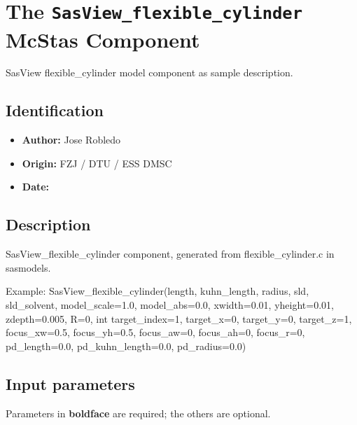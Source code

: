 \section{The \texttt{SasView\_flexible\_cylinder} McStas Component}
SasView flexible\_cylinder model component as sample description.

\subsection*{Identification}
\begin{itemize}
  \item \textbf{Author:} Jose Robledo
  \item \textbf{Origin:} FZJ / DTU / ESS DMSC
  \item \textbf{Date:} 
\end{itemize}

\subsection*{Description}
SasView\_flexible\_cylinder component, generated from flexible\_cylinder.c in sasmodels.

Example: SasView\_flexible\_cylinder(length, kuhn\_length, radius, sld, sld\_solvent, model\_scale=1.0, model\_abs=0.0, xwidth=0.01, yheight=0.01, zdepth=0.005, R=0, int target\_index=1, target\_x=0, target\_y=0, target\_z=1, focus\_xw=0.5, focus\_yh=0.5, focus\_aw=0, focus\_ah=0, focus\_r=0, pd\_length=0.0, pd\_kuhn\_length=0.0, pd\_radius=0.0)

\subsection*{Input parameters}
Parameters in \textbf{boldface} are required; the others are optional.

